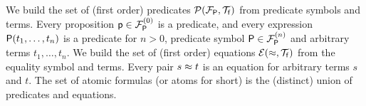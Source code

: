 
\begin{definition}\label{def:predicates}\label{def:equations}\label{def:atoms}
	We build the set of (first order) {\myem predicates} $\mcPT$
	from predicate symbols and terms.
	Every proposition $\mpp\in \mcFPn[0]$ is a predicate,
	and every expression $\mP(t_1,\ldots,t_n)$ is a predicate for $n>0$,
	predicate symbol $\mP\in\mcFPn$ and arbitrary terms $t_1,\ldots,t_n$.
%
	We build the set of (first order) {\myem equations }$\mcET$ from the equality symbol and terms.
	Every pair $s\mEQ t$ is an equation %
	for arbitrary terms $s$ and $t$.
%
	The set of atomic formulas (or {\myem atoms} for short) is the (distinct) union of predicates and equations.
\end{definition}